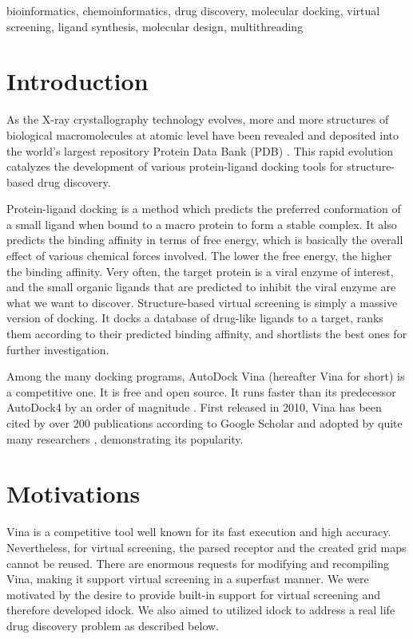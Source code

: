 \documentclass[10pt, conference, compsocconf]{../IEEEtran}
\begin{document}
\begin{IEEEkeywords}

bioinformatics, chemoinformatics, drug discovery, molecular docking, virtual screening, ligand synthesis, molecular design, multithreading

\end{IEEEkeywords}

\section{Introduction}

As the X-ray crystallography technology evolves, more and more structures of biological macromolecules at atomic level have been revealed and deposited into the world's largest repository Protein Data Bank (PDB) \cite{539,537}. This rapid evolution catalyzes the development of various protein-ligand docking tools for structure-based drug discovery.

Protein-ligand docking is a method which predicts the preferred conformation of a small ligand when bound to a macro protein to form a stable complex. It also predicts the binding affinity in terms of free energy, which is basically the overall effect of various chemical forces involved. The lower the free energy, the higher the binding affinity. Very often, the target protein is a viral enzyme of interest, and the small organic ligands that are predicted to inhibit the viral enzyme are what we want to discover. Structure-based virtual screening is simply a massive version of docking. It docks a database of drug-like ligands to a target, ranks them according to their predicted binding affinity, and shortlists the best ones for further investigation.

Among the many docking programs, AutoDock Vina \cite{595} (hereafter Vina for short) is a competitive one. It is free and open source. It runs faster than its predecessor AutoDock4 \cite{596} by an order of magnitude \cite{556}. First released in 2010, Vina has been cited by over 200 publications according to Google Scholar and adopted by quite many researchers \cite{609}, demonstrating its popularity.

\section{Motivations}

Vina is a competitive tool well known for its fast execution and high accuracy. Nevertheless, for virtual screening, the parsed receptor and the created grid maps cannot be reused. There are enormous requests for modifying and recompiling Vina, making it support virtual screening in a superfast manner. We were motivated by the desire to provide built-in support for virtual screening and therefore developed idock. We also aimed to utilized idock to address a real life drug discovery problem as described below.
\end{document}

